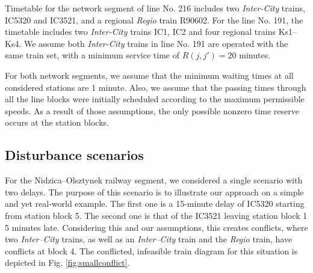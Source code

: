 Timetable for the network segment of line No. 216 includes two
\emph{Inter-City} trains, IC5320 and IC3521, and a regional \emph{Regio} train
R90602. For the line No. 191, the timetable includes two \emph{Inter-City}
trains IC1, IC2 and four regional trains Ks1--Ks4. We assume both
\emph{Inter-City} trains in line No. 191 are operated with the same train set,
with a minimum service time of $R(j,j') = 20$ minutes.

For both network segments, we assume that the minimum waiting times at all
considered stations are 1 minute. Also, we assume that the passing times
through all the line blocks were initially scheduled according to the maximum
permissible speeds. As a result of those assumptions, the only possible nonzero
time reserve occurs at the station blocks.

\subsection{Disturbance scenarios}

For the Nidzica--Olsztynek railway segment, we considered a single scenario
with two delays. The purpose of this scenario is to illustrate our approach on
a simple and yet real-world example. The first one is a 15-minute delay of
IC5320 starting from station block 5. The second one is that of the IC3521
leaving station block 1 5 minutes late. Considering this and our assumptions,
this creates conflicts, where two \emph{Inter--City} trains, as well as an
\emph{Inter--City} train and the \emph{Regio} train, have conflicts at block 4.
The conflicted, infeasible train diagram for this situation is depicted in Fig.
\ref{fig:smallconflict}.

